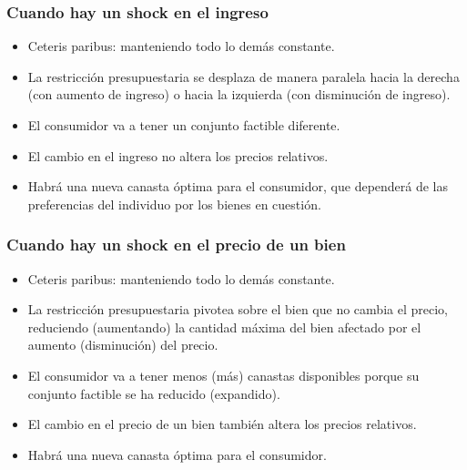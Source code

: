 \documentclass{beamer}
\begin{document}
\begin{frame}
\frametitle{Cuando hay un shock en el ingreso}
\begin{itemize}
    \item Ceteris paribus: manteniendo todo lo demás constante.
    \item La restricción presupuestaria se desplaza de manera paralela hacia la derecha (con aumento de ingreso) o hacia la izquierda (con disminución de ingreso).
    \item El consumidor va a tener un conjunto factible diferente.
    \item El cambio en el ingreso no altera los precios relativos. \vspace{1mm}
    \item Habrá una nueva canasta óptima para el consumidor, que dependerá de las preferencias del individuo por los bienes en cuestión.  \vspace{1mm}
\end{itemize}
\end{frame}




\begin{frame}
\frametitle{Cuando hay un shock en el precio de un bien}
\begin{itemize}
    \item Ceteris paribus: manteniendo todo lo demás constante.
    \item La restricción presupuestaria pivotea sobre el bien que no cambia el precio, reduciendo (aumentando) la cantidad máxima del bien afectado por el aumento (disminución) del precio.  
    \item El consumidor va a tener menos (más) canastas disponibles porque su conjunto factible se ha reducido (expandido).
    \item El cambio en el precio de un bien también altera los precios relativos. \vspace{1mm}
    \item Habrá una nueva canasta óptima para el consumidor.  \vspace{1mm}
\end{itemize}
\end{frame}
\end{document}
